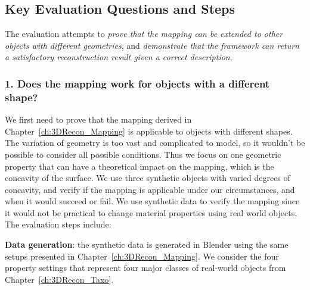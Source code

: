 \subsection{Key Evaluation Questions and Steps}

The evaluation attempts to \textit{prove that the mapping can be extended to other objects with different geometries}, and \textit{demonstrate that the framework can return a satisfactory reconstruction result given a correct description}.

\subsubsection{1. Does the mapping work for objects with a different shape?}
We first need to prove that the mapping derived in Chapter~\ref{ch:3DRecon_Mapping} is applicable to objects with different shapes. The variation of geometry is too vast and complicated to model, so it wouldn't be possible to consider all possible conditions. Thus we focus on one geometric property that can have a theoretical impact on the mapping, which is the concavity of the surface. We use three synthetic objects with varied degrees of concavity, and verify if the mapping is applicable under our circumstances, and when it would succeed or fail. We use synthetic data to verify the mapping since it would not be practical to change material properties using real world objects. The evaluation steps include:


\noindent\textbf{Data generation}: the synthetic data is generated in Blender using the same setups presented in Chapter~\ref{ch:3DRecon_Mapping}. We consider the four property settings that represent four major classes of real-world objects from Chapter~\ref{ch:3DRecon_Taxo}.



